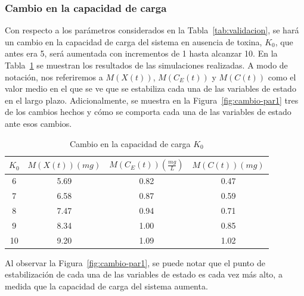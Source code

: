 \subsubsection{Cambio en la capacidad de carga}
Con respecto a los parámetros considerados en la Tabla~\ref{tab:validacion}, se hará un cambio en la capacidad de carga del sistema en ausencia de toxina, $K_0$, que antes era 5, será aumentada con incrementos de 1 hasta alcanzar 10. En la Tabla~\ref{tab:cambio-par1} se muestran los resultados de las simulaciones realizadas. A modo de notación, nos referiremos a $M(X(t))$, $M(C_E(t))$ y $M(C(t))$ como el valor medio en el que se ve que se estabiliza cada una de las variables de estado en el largo plazo. Adicionalmente, se muestra en la Figura~\ref{fig:cambio-par1} tres de los cambios hechos y cómo se comporta cada una de las variables de estado ante esos cambios.

\begin{table}[ht!]
\centering
\caption{Cambio en la capacidad de carga $K_0$}
\label{tab:cambio-par1}
\begin{tabular}{|c|c|c|c|}
\hline
$K_0$ & $M(X(t))(mg)$ & $M(C_E(t))(\frac{mg}{L})$ & $M(C(t))(mg)$ \\\hline
6 & 5.69 & 0.82 & 0.47 \\\hline
7 & 6.58 & 0.87 & 0.59 \\\hline
8 & 7.47 & 0.94 & 0.71 \\\hline
9 & 8.34 & 1.00 & 0.85 \\\hline
10 & 9.20 & 1.09 & 1.02 \\\hline
\end{tabular}
\end{table}

Al observar la Figura~\ref{fig:cambio-par1}, se puede notar que el punto de estabilización de cada una de las variables de estado es cada vez más alto, a medida que la capacidad de carga del sistema aumenta.

